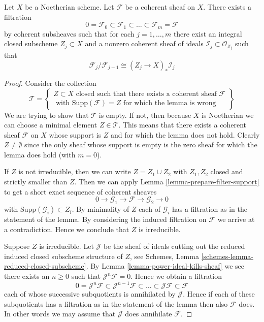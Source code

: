 \begin{lemma}
\label{lemma-coherent-filter}
Let $X$ be a Noetherian scheme.
Let $\mathcal{F}$ be a coherent sheaf on $X$.
There exists a filtration
$$
0 = \mathcal{F}_0 \subset \mathcal{F}_1 \subset
\ldots \subset \mathcal{F}_m = \mathcal{F}
$$
by coherent subsheaves such that for each $j = 1, \ldots, m$
there exist an integral closed subscheme $Z_j \subset X$ and
a nonzero coherent sheaf of ideals $\mathcal{I}_j \subset \mathcal{O}_{Z_j}$
such that
$$
\mathcal{F}_j/\mathcal{F}_{j - 1}
\cong (Z_j \to X)_* \mathcal{I}_j
$$
\end{lemma}

\begin{proof}
Consider the collection
$$
\mathcal{T} =
\left\{
\begin{matrix}
Z \subset X
\text{ closed such that there exists a coherent sheaf }
\mathcal{F} \\
\text{ with }
\text{Supp}(\mathcal{F}) = Z
\text{ for which the lemma is wrong}
\end{matrix}
\right\}
$$
We are trying to show that $\mathcal{T}$ is empty. If not, then
because $X$ is Noetherian we can choose a minimal element
$Z \in \mathcal{T}$. This means that there exists a coherent
sheaf $\mathcal{F}$ on $X$ whose support is $Z$ and for which the
lemma does not hold. Clearly $Z \not = \emptyset$ since the only
sheaf whose support is empty is the zero sheaf for which the
lemma does hold (with $m = 0$).

\medskip\noindent
If $Z$ is not irreducible, then we can write $Z = Z_1 \cup Z_2$
with $Z_1, Z_2$ closed and strictly smaller than $Z$.
Then we can apply Lemma \ref{lemma-prepare-filter-support}
to get a short exact sequence of coherent sheaves
$$
0 \to
\mathcal{G}_1 \to
\mathcal{F} \to
\mathcal{G}_2 \to 0
$$
with $\text{Supp}(\mathcal{G}_i) \subset Z_i$. By minimality of
$Z$ each of $\mathcal{G}_i$ has a filtration as in the statement
of the lemma. By considering the induced filtration on $\mathcal{F}$
we arrive at a contradiction. Hence we conclude
that $Z$ is irreducible.

\medskip\noindent
Suppose $Z$ is irreducible. Let $\mathcal{J}$ be the sheaf of ideals
cutting out the reduced induced closed subscheme structure of $Z$,
see Schemes, Lemma \ref{schemes-lemma-reduced-closed-subscheme}.
By Lemma \ref{lemma-power-ideal-kills-sheaf} we see there exists
an $n \geq 0$ such that $\mathcal{J}^n\mathcal{F} = 0$. Hence we obtain
a filtration
$$
0 = \mathcal{J}^n\mathcal{F} \subset \mathcal{J}^{n - 1}\mathcal{F}
\subset \ldots \subset \mathcal{J}\mathcal{F} \subset \mathcal{F}
$$
each of whose successive subquotients is annihilated by $\mathcal{J}$.
Hence if each of these subquotients has a filtration as in the statement
of the lemma then also $\mathcal{F}$ does. In other words we may
assume that $\mathcal{J}$ does annihilate $\mathcal{F}$.


\end{proof}
